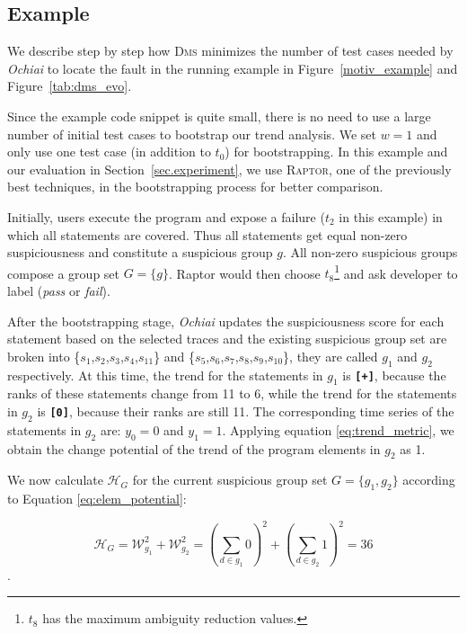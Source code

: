 \subsection{Example}
We describe step by step how \textsc{Dms} minimizes the number of test cases needed by {\em Ochiai} to locate
the fault in the running example in Figure~\ref{motiv_example} and Figure~\ref{tab:dms_evo}.

Since the example code snippet is quite small, there is no need to use a large number of initial test cases to bootstrap our trend analysis. %
We set $w=1$ and only use one test case (in addition to $t_0$) for bootstrapping. In this example and our evaluation in Section~\ref{sec.experiment}, we use \textsc{Raptor}, one of the previously best techniques, in the bootstrapping process for better comparison.

Initially, users execute the program and expose a failure ($t_2$ in this example) in which all statements are covered.
Thus all statements get equal non-zero suspiciousness and constitute a suspicious group $g$. All non-zero suspicious groups compose a group set $G = \{g\}$.
{\sc Raptor} would then choose $t_8$\footnote{$t_8$ has the maximum ambiguity reduction values.} and ask developer to label ({\em pass} or {\em fail}).


After the bootstrapping stage, {\em Ochiai} updates the suspiciousness score for each statement based on the selected traces
and the existing suspicious group set are broken into \{$s_{1}$,$s_{2}$,$s_{3}$,$s_{4}$,$s_{11}$\} and \{$s_{5}$,$s_{6}$,$s_{7}$,$s_{8}$,$s_{9}$,$s_{10}$\}, they are
called $g_{1}$ and $g_{2}$ respectively.
At this time, the trend for the statements in $g_{1}$ is {\bf\texttt{[+]}}, because the ranks of these statements change from 11 to 6, while the trend for the statements in $g_{2}$
is {\bf\texttt{[0]}}, because their ranks are still 11.
The corresponding time series of the statements in $g_{2}$ are:
$y_{0} = 0$ and $ y_{1} = 1$. Applying equation \ref{eq:trend_metric}, we obtain the change potential of the trend of the program elements in $g_{2}$ as 1.


We now calculate $\mathcal{H}_{G}$ for the current suspicious group set $G=\{g_{1},g_{2}\}$ according to Equation \ref{eq:elem_potential}:

\[\mathcal{H}_{G} = \mathcal{W}_{g_{1}}^{2} + \mathcal{W}_{g_{2}}^{2}  = (\sum_{d \in g_{1}}{0})^{2} + (\sum_{d \in g_{2}}{1})^{2} = 36\].

